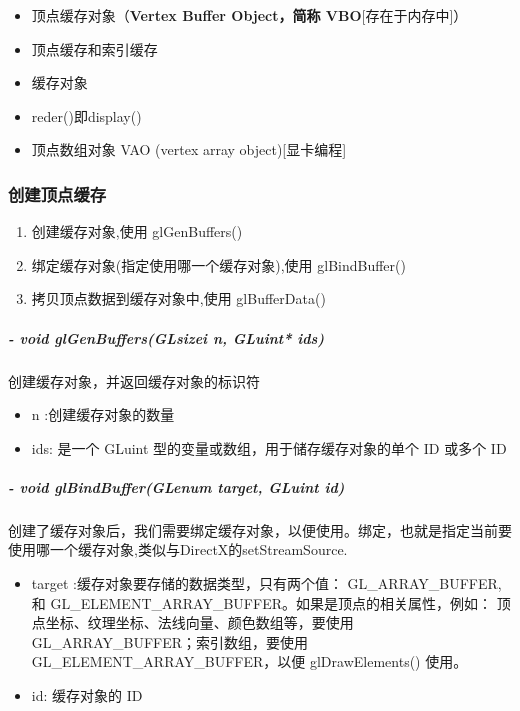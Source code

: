 \documentclass[UTF8,a4paper,12pt]{ctexbook}
\begin{document}
		\begin{itemize}
			\item  顶点缓存对象（\textbf{Vertex Buffer Object，简称 VBO}[存在于内存中]）
			\item  顶点缓存和索引缓存
			\item  缓存对象
			\item  reder()即display()
			\item 顶点数组对象 VAO (vertex array object)[显卡编程]
		\end{itemize}
		
		\subsubsection{创建顶点缓存}
			\begin{enumerate}
				\item 创建缓存对象,使用 glGenBuffers()
				\item 绑定缓存对象(指定使用哪一个缓存对象),使用 glBindBuffer()
				\item 拷贝顶点数据到缓存对象中,使用 glBufferData()
			\end{enumerate}
			
			\subparagraph{- void glGenBuffers(GLsizei n, GLuint* ids)}创建缓存对象，并返回缓存对象的标识符
				\begin{itemize}
					\item n :创建缓存对象的数量
					\item ids: 是一个 GLuint 型的变量或数组，用于储存缓存对象的单个 ID 或多个 ID
				\end{itemize}
				
			\subparagraph{- void glBindBuffer(GLenum target, GLuint id)}创建了缓存对象后，我们需要绑定缓存对象，以便使用。绑定，也就是指定当前要使用哪一个缓存对象,类似与DirectX的setStreamSource.
				\begin{itemize}
					\item target :缓存对象要存储的数据类型，只有两个值： GL\_ARRAY\_BUFFER, 和 GL\_ELEMENT\_ARRAY\_BUFFER。如果是顶点的相关属性，例如： 顶点坐标、纹理坐标、法线向量、颜色数组等，要使用 GL\_ARRAY\_BUFFER；索引数组，要使用 GL\_ELEMENT\_ARRAY\_BUFFER，以便 glDrawElements() 使用。
					
					\item id: 缓存对象的 ID
				\end{itemize}
			
\end{document}
